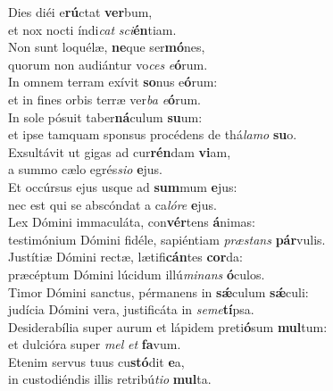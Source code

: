 \evenverse Dies diéi e\textbf{rú}ctat \textbf{ver}bum,~\*\\
\evenverse et nox nocti índi\textit{cat} \textit{sci}\textbf{én}tiam.\\
\oddverse Non sunt loquélæ, \textbf{ne}que ser\textbf{mó}nes,~\*\\
\oddverse quorum non audiántur vo\textit{ces} \textit{e}\textbf{ó}rum.\\
\evenverse In omnem terram exívit \textbf{so}nus e\textbf{ó}rum:~\*\\
\evenverse et in fines orbis terræ ver\textit{ba} \textit{e}\textbf{ó}rum.\\
\oddverse In sole pósuit taber\textbf{ná}culum \textbf{su}um:~\*\\
\oddverse et ipse tamquam sponsus procédens de thá\textit{la}\textit{mo} \textbf{su}o.\\
\evenverse Exsultávit ut gigas ad cur\textbf{rén}dam \textbf{vi}am,~\*\\
\evenverse a summo cælo egrés\textit{si}\textit{o} \textbf{e}jus.\\
\oddverse Et occúrsus ejus usque ad \textbf{sum}mum \textbf{e}jus:~\*\\
\oddverse nec est qui se abscóndat a ca\textit{ló}\textit{re} \textbf{e}jus.\\
\evenverse Lex Dómini immaculáta, con\textbf{vér}tens \textbf{á}nimas:~\*\\
\evenverse testimónium Dómini fidéle, sapiéntiam \textit{præ}\textit{stans} \textbf{pár}vulis.\\
\oddverse Justítiæ Dómini rectæ, lætifi\textbf{cán}tes \textbf{cor}da:~\*\\
\oddverse præcéptum Dómini lúcidum illú\textit{mi}\textit{nans} \textbf{ó}culos.\\
\evenverse Timor Dómini sanctus, pérmanens in \textbf{sǽ}culum \textbf{sǽ}culi:~\*\\
\evenverse judícia Dómini vera, justificáta in \textit{se}\textit{me}\textbf{tí}psa.\\
\oddverse Desiderabília super aurum et lápidem preti\textbf{ó}sum \textbf{mul}tum:~\*\\
\oddverse et dulcióra super \textit{mel} \textit{et} \textbf{fa}vum.\\
\evenverse Etenim servus tuus cu\textbf{stó}dit \textbf{e}a,~\*\\
\evenverse in custodiéndis illis retribú\textit{ti}\textit{o} \textbf{mul}ta.\\
